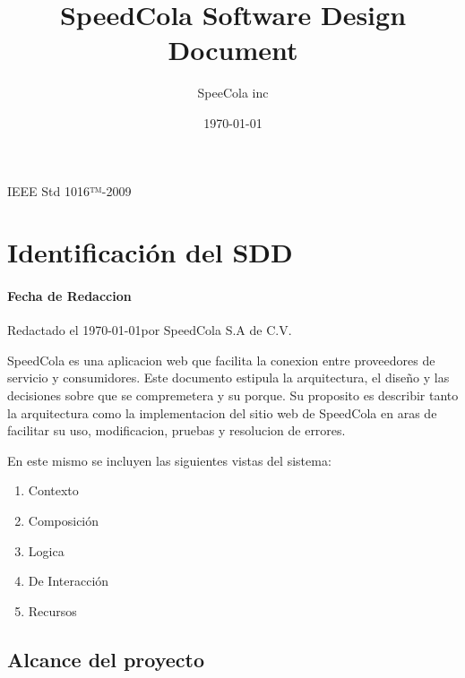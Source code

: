 \documentclass{article}
\title{SpeedCola Software Design Document}
\date{\today}%
\author{SpeeCola inc}%
\begin{document}
\maketitle
IEEE Std 1016™-2009

\newpage
{}

  \iffalse  
  ⎯ Date of issue and status
  ⎯ Scope
  ⎯ Issuing organization
  ⎯ Authorship (responsibility or copyright information)
  ⎯ References
  \fi
  \section{Identificaci\'on del SDD}
  \paragraph {Fecha de Redaccion} Redactado el \today \space por SpeedCola S.A de C.V.\newline

  SpeedCola es una aplicacion web que facilita la conexion entre proveedores de servicio y consumidores. 
  Este documento estipula la arquitectura, el dise\~no y 
    las decisiones sobre que se compremetera y su porque. Su proposito es describir tanto la arquitectura como la implementacion del sitio web de  
  SpeedCola en aras de facilitar su uso, modificacion, pruebas y resolucion de errores.

    En este mismo se incluyen las siguientes vistas del sistema:
    \begin{multicols}{3}
    \begin{enumerate}

      \item Contexto
      \item Composici\'on 
      \item Logica
      \item De Interacci\'on
      \item Recursos

    \end{enumerate}
  \end{multicols}

  \subsection{Alcance del proyecto}
\end{document}
